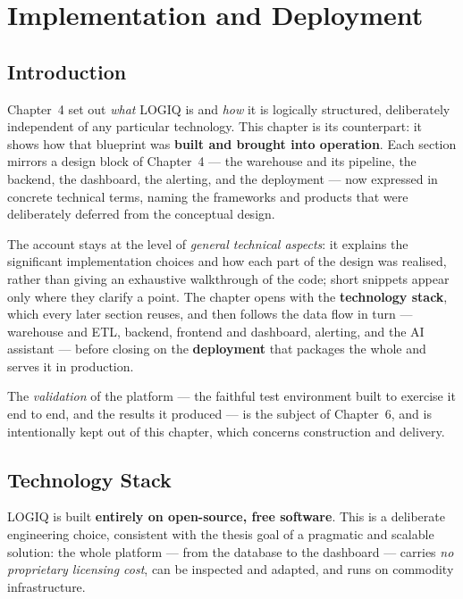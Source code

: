 \chapter{Implementation and Deployment}

\section*{Introduction}

Chapter~4 set out \emph{what} LOGIQ is and \emph{how} it is logically structured, deliberately
independent of any particular technology. This chapter is its counterpart: it shows how that blueprint
was \textbf{built and brought into operation}. Each section mirrors a design block of Chapter~4 ---
the warehouse and its pipeline, the backend, the dashboard, the alerting, and the deployment --- now
expressed in concrete technical terms, naming the frameworks and products that were deliberately
deferred from the conceptual design.

The account stays at the level of \emph{general technical aspects}: it explains the significant
implementation choices and how each part of the design was realised, rather than giving an exhaustive
walkthrough of the code; short snippets appear only where they clarify a point. The chapter opens with
the \textbf{technology stack}, which every later section reuses, and then follows the data flow in
turn --- warehouse and ETL, backend, frontend and dashboard, alerting, and the AI assistant --- before
closing on the \textbf{deployment} that packages the whole and serves it in production.

The \emph{validation} of the platform --- the faithful test environment built to exercise it end to end,
and the results it produced --- is the subject of Chapter~6, and is intentionally kept out of this
chapter, which concerns construction and delivery.

\section{Technology Stack}
\label{sec:ch5-stack}

LOGIQ is built \textbf{entirely on open-source, free software}. This is a deliberate engineering
choice, consistent with the thesis goal of a pragmatic and scalable solution: the whole platform ---
from the database to the dashboard --- carries \emph{no proprietary licensing cost}, can be inspected
and adapted, and runs on commodity infrastructure.

